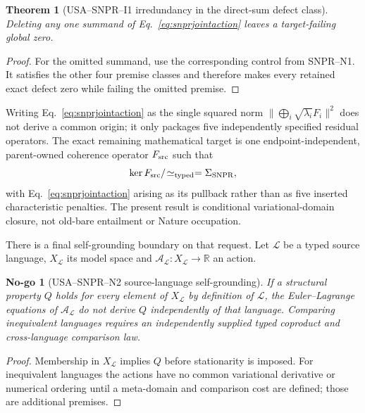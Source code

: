 \documentclass[11pt,a4paper]{article}
\newtheorem{theorem}[definition]{Theorem}
\newtheorem{nogo}[definition]{No-go}
\theoremstyle{remark}
\begin{document}
\begin{theorem}[USA--SNPR--I1 irredundancy in the direct-sum defect class]
Deleting any one summand of Eq.~\eqref{eq:snprjointaction} leaves a
target-failing global zero.
\label{thm:snprjointirredundancy}
\end{theorem}

\begin{proof}
For the omitted summand, use the corresponding control from
SNPR--N1.  It satisfies the other four premise classes and therefore makes
every retained exact defect zero while failing the omitted premise.
\end{proof}

Writing Eq.~\eqref{eq:snprjointaction} as the single squared norm
$\|\bigoplus_i\sqrt{\lambda_i}F_i\|^2$ does not derive a common origin; it
only packages five independently specified residual operators.  The exact
remaining mathematical target is one endpoint-independent, parent-owned
coherence operator $F_{\rm src}$ such that
\begin{equation}
 \ker F_{\rm src}/\!\simeq_{\rm typed}=\Sigma_{\rm SNPR},
 \label{eq:snprprimitivekernel}
\end{equation}
with Eq.~\eqref{eq:snprjointaction} arising as its pullback rather than as five
inserted characteristic penalties.  The present result is conditional
variational-domain closure, not old-bare entailment or Nature occupation.

There is a final self-grounding boundary on that request.  Let
$\mathcal L$ be a typed source language, $X_{\mathcal L}$ its model space and
$\mathcal A_{\mathcal L}:X_{\mathcal L}\to\mathbb R$ an action.

\begin{nogo}[USA--SNPR--N2 source-language self-grounding]
If a structural property $Q$ holds for every element of $X_{\mathcal L}$ by
definition of $\mathcal L$, the Euler--Lagrange equations of
$\mathcal A_{\mathcal L}$ do not derive $Q$ independently of that language.
Comparing inequivalent languages requires an independently supplied typed
coproduct and cross-language comparison law.
\label{nogo:snprlanguage}
\end{nogo}

\begin{proof}
Membership in $X_{\mathcal L}$ implies $Q$ before stationarity is imposed.
For inequivalent languages the actions have no common variational derivative
or numerical ordering until a meta-domain and comparison cost are defined;
those are additional premises.
\end{proof}
\end{document}
